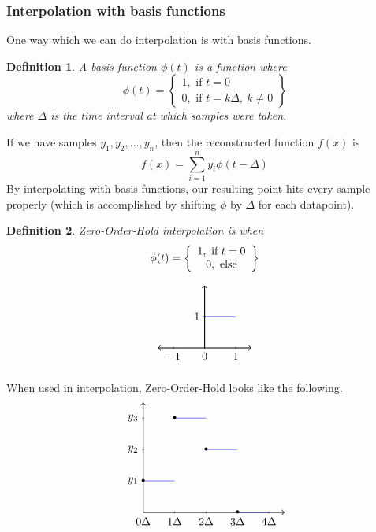 \documentclass{article}
\newtheorem{definition}{Definition}
\begin{document}
\subsubsection{Interpolation with basis functions}
One way which we can do interpolation is with basis functions.
\begin{definition}
    A basis function $\phi(t)$ is a function where
    \[
        \phi(t) = \left\{
            \begin{array}{c}
                1, \text{ if } t = 0\\
                0,\text{ if } t=k\Delta,\ k \ne 0
            \end{array}
        \right\}
     \]
     where $\Delta$ is the time interval at which samples were taken.
\end{definition}
If we have samples $y_1, y_2,..., y_n$, then the reconstructed function $f(x)$ is
$$f(x) = \sum_{i=1}^{n}{y_i\phi(t-\Delta)}$$
By interpolating with basis functions, our resulting point hits every sample properly
(which is accomplished by shifting $\phi$ by $\Delta$ for each datapoint).
\begin{definition}
    Zero-Order-Hold interpolation is when
    \[
        \begin{array}{c}
            \phi(t) = \left\{
            \begin{array}{c}
                1, \text{ if } t = 0\\
                0, \text{ else}
            \end{array}
        \right\}\\\\
        \begin{tikzpicture}
            \draw[thick,<->] (-1.5, 0) -- (1.5,0);
            \draw[thick,->] (0,0) -- (0,2);
            \foreach \x in {-1,0,1}
                \draw (\x cm,1pt) -- (\x cm,-1pt) node[anchor=north] {$\x$};
            \foreach \y in {1}
                \draw (1pt,\y cm) -- (-1pt,\y cm) node[anchor=east] {$\y$};
                \draw[scale=1,domain=0:1,smooth,variable=\x,blue] plot ({\x},{1});
        \end{tikzpicture}
        \end{array}
    \]
\end{definition}
When used in interpolation, Zero-Order-Hold looks like the following.
\[
    \begin{tikzpicture}
        \draw[thick,->] (0, 0) -- (4.5,0);
        \draw[thick,->] (0,0) -- (0,3.5);
        \foreach \x in {0,1, 2, 3, 4}
            \draw (\x cm,1pt) -- (\x cm,-1pt) node[anchor=north] {$\x \Delta$};
        \foreach \y in {1,2,3}
            \draw (1pt,\y cm) -- (-1pt,\y cm) node[anchor=east] {$y_{\y}$};
        \draw[scale=1,domain=0:1,smooth,variable=\x,blue] plot ({\x},{1});
        \draw[scale=1,domain=2:3,smooth,variable=\x,blue] plot ({\x},{2});
        \draw[scale=1,domain=1:2,smooth,variable=\x,blue] plot ({\x},{3});
        \draw[scale=1,domain=3:4,smooth,variable=\x,blue] plot ({\x},{0});
        \foreach \Point in {(0,1), (2,2), (1,3), (3, 0)}{
            \node at \Point {\textbullet};
        }
    \end{tikzpicture}
\]
\end{document}
